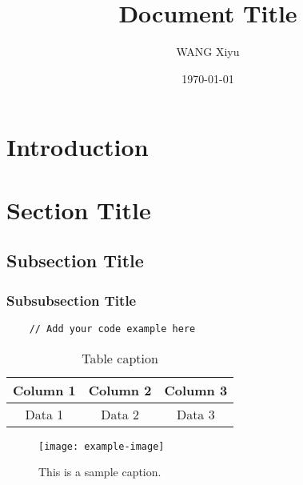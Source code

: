 \documentclass[12pt]{article} %
\title{Document Title}
\author{WANG Xiyu}
\date{\today}
\begin{document}
\maketitle

\tableofcontents %

\section{Introduction}

\section{Section Title}

\subsection{Subsection Title}

\subsubsection{Subsubsection Title}

\begin{lstlisting}
    // Add your code example here
\end{lstlisting}

\begin{table}[h]
    \centering
    \begin{tabular}{|c|c|c|}
    \hline
    Column 1 & Column 2 & Column 3 \\ \hline
    Data 1 & Data 2 & Data 3 \\ \hline
    \end{tabular}
    \caption{Table caption}
\end{table}

\begin{figure}[h]
    \centering
    \texttt{[image: example-image]} %
    \caption{This is a sample caption.}
    \label{fig:example}
\end{figure}
\end{document}
